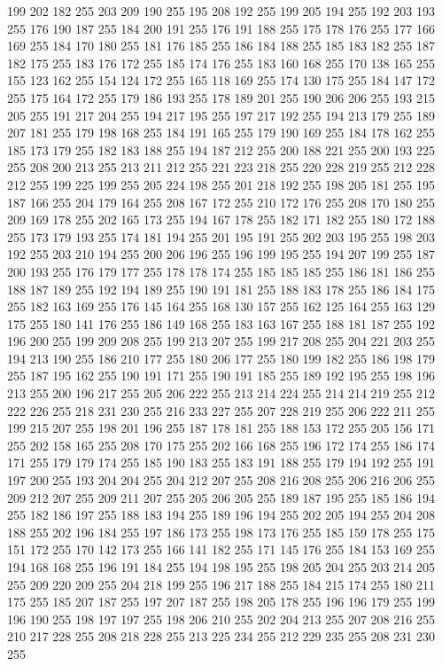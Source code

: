 199 202 182 255 203 209 190 255 195 208 192 255 199 205 194 255 192 203 193 255 176 190 187 255 184 200 191 255 176 191 188 255 175 178 176 255 177 166 169 255 184 170 180 255 181 176 185 255 186 184 188 255 185 183 182 255 187 182 175 255 183 176 172 255
185 174 176 255 183 160 168 255 170 138 165 255 155 123 162 255 154 124 172 255 165 118 169 255 174 130 175 255 184 147 172 255 175 164 172 255 179 186 193 255 178 189 201 255 190 206 206 255 193 215 205 255 191 217 204 255 194 217 195 255 197 217 192 255
194 213 179 255 189 207 181 255 179 198 168 255 184 191 165 255 179 190 169 255 184 178 162 255 185 173 179 255 182 183 188 255 194 187 212 255 200 188 221 255 200 193 225 255 208 200 213 255 213 211 212 255 221 223 218 255 220 228 219 255 212 228 212 255
199 225 199 255 205 224 198 255 201 218 192 255 198 205 181 255 195 187 166 255 204 179 164 255 208 167 172 255 210 172 176 255 208 170 180 255 209 169 178 255 202 165 173 255 194 167 178 255 182 171 182 255 180 172 188 255 173 179 193 255 174 181 194 255
201 195 191 255 202 203 195 255 198 203 192 255 203 210 194 255 200 206 196 255 196 199 195 255 194 207 199 255 187 200 193 255 176 179 177 255 178 178 174 255 185 185 185 255 186 181 186 255 188 187 189 255 192 194 189 255 190 191 181 255 188 183 178 255
186 184 175 255 182 163 169 255 176 145 164 255 168 130 157 255 162 125 164 255 163 129 175 255 180 141 176 255 186 149 168 255 183 163 167 255 188 181 187 255 192 196 200 255 199 209 208 255 199 213 207 255 199 217 208 255 204 221 203 255 194 213 190 255
186 210 177 255 180 206 177 255 180 199 182 255 186 198 179 255 187 195 162 255 190 191 171 255 190 191 185 255 189 192 195 255 198 196 213 255 200 196 217 255 205 206 222 255 213 214 224 255 214 214 219 255 212 222 226 255 218 231 230 255 216 233 227 255
207 228 219 255 206 222 211 255 199 215 207 255 198 201 196 255 187 178 181 255 188 153 172 255 205 156 171 255 202 158 165 255 208 170 175 255 202 166 168 255 196 172 174 255 186 174 171 255 179 179 174 255 185 190 183 255 183 191 188 255 179 194 192 255
191 197 200 255 193 204 204 255 204 212 207 255 208 216 208 255 206 216 206 255 209 212 207 255 209 211 207 255 205 206 205 255 189 187 195 255 185 186 194 255 182 186 197 255 188 183 194 255 189 196 194 255 202 205 194 255 204 208 188 255 202 196 184 255
197 186 173 255 198 173 176 255 185 159 178 255 175 151 172 255 170 142 173 255 166 141 182 255 171 145 176 255 184 153 169 255 194 168 168 255 196 191 184 255 194 198 195 255 198 205 204 255 203 214 205 255 209 220 209 255 204 218 199 255 196 217 188 255
184 215 174 255 180 211 175 255 185 207 187 255 197 207 187 255 198 205 178 255 196 196 179 255 199 196 190 255 198 197 197 255 198 206 210 255 202 204 213 255 207 208 216 255 210 217 228 255 208 218 228 255 213 225 234 255 212 229 235 255 208 231 230 255

